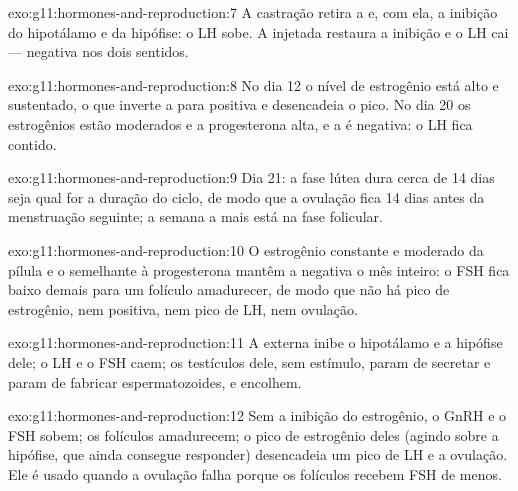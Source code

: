 \begin{solution}{exo:g11:hormones-and-reproduction:7}
A castração retira a  e, com ela, a inibição do hipotálamo
e da hipófise: o LH sobe. A  injetada restaura a inibição e
o LH cai ---  negativa nos dois sentidos.
\end{solution}

\begin{solution}{exo:g11:hormones-and-reproduction:8}
No dia 12 o nível de estrogênio está alto e sustentado, o que inverte a
 para positiva e desencadeia o pico. No dia 20 os
estrogênios estão moderados e a progesterona alta, e a 
é negativa: o LH fica contido.
\end{solution}

\begin{solution}{exo:g11:hormones-and-reproduction:9}
Dia 21: a fase lútea dura cerca de 14 dias seja qual for a duração do
ciclo, de modo que a ovulação fica 14 dias antes da menstruação
seguinte; a semana a mais está na fase folicular.
\end{solution}

\begin{solution}{exo:g11:hormones-and-reproduction:10}
O estrogênio constante e moderado da pílula e o  semelhante à
progesterona mantêm a  negativa o mês inteiro: o FSH
fica baixo demais para um folículo amadurecer, de modo que não há pico
de estrogênio, nem  positiva, nem pico de LH, nem
ovulação.
\end{solution}

\begin{solution}{exo:g11:hormones-and-reproduction:11}
A  externa inibe o hipotálamo e a hipófise dele; o LH e o
FSH caem; os testículos dele, sem estímulo, param de secretar e param
de fabricar espermatozoides, e encolhem.
\end{solution}

\begin{solution}{exo:g11:hormones-and-reproduction:12}
Sem a inibição do estrogênio, o GnRH e o FSH sobem; os folículos
amadurecem; o pico de estrogênio deles (agindo sobre a hipófise, que
ainda consegue responder) desencadeia um pico de LH e a ovulação. Ele é
usado quando a ovulação falha porque os folículos recebem FSH de menos.
\end{solution}

